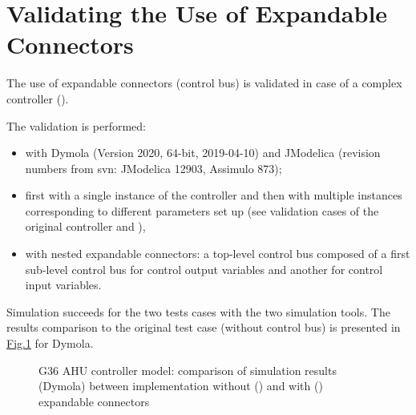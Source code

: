 \documentclass[letterpaper,10pt, openany,english]{sphinxmanual}
\let\sphinxpxdimen\pdfpxdimen\else\newdimen\sphinxpxdimen
\begin{document}
\section{Validating the Use of Expandable Connectors}
\label{\detokenize{annex:validating-the-use-of-expandable-connectors}}\label{\detokenize{annex:sec-annex-bus-valid}}
The use of expandable connectors (control bus) is validated in case of a complex controller ().

The validation is performed:
\begin{itemize}
\item {} 
with Dymola (Version 2020, 64-bit, 2019-04-10) and JModelica (revision numbers from svn: JModelica 12903, Assimulo 873);

\item {} 
first with a single instance of the controller and then with multiple instances corresponding to different parameters set up (see validation cases of the original controller  and ),

\item {} 
with nested expandable connectors: a top-level control bus composed of a first sub-level control bus for control output variables and another for control input variables.

\end{itemize}

Simulation succeeds for the two tests cases with the two simulation tools.
The results comparison to the original test case (without control bus) is presented in \hyperref[\detokenize{annex:annex-valid-bus}]{Fig.\@ \ref{\detokenize{annex:annex-valid-bus}}} for Dymola.

\begin{figure}[htbp]
\centering
\capstart

\noindent\sphinxincludegraphics[width=800\sphinxpxdimen]{{annex_valid_bus}.pdf}
\caption{G36 AHU controller model: comparison of simulation results (Dymola) between implementation without () and with () expandable connectors}\label{\detokenize{annex:annex-valid-bus}}\end{figure}
\end{document}
